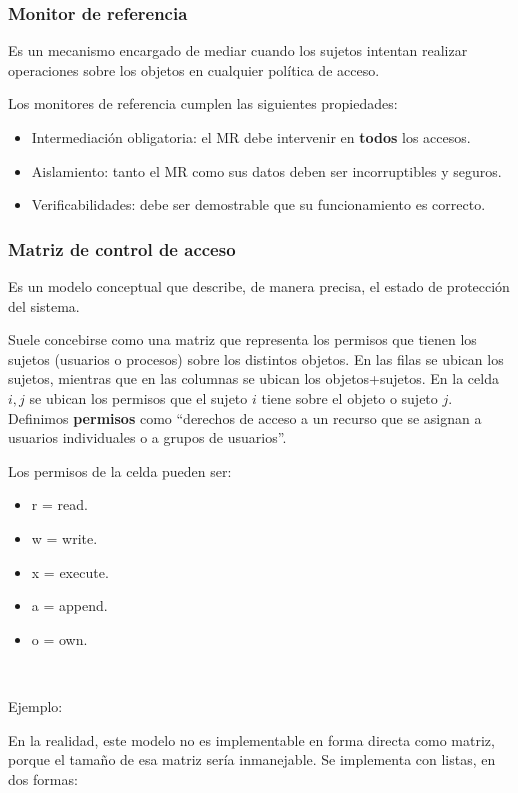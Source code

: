 \documentclass[]{article}
\begin{document}
\subsubsection{Monitor de referencia}
Es un mecanismo encargado de mediar cuando los sujetos intentan realizar operaciones sobre los objetos en cualquier política de acceso.

Los monitores de referencia cumplen las siguientes propiedades:
\begin{itemize}
	\item Intermediación obligatoria: el MR debe intervenir en \textbf{todos} los accesos.
	\item Aislamiento: tanto el MR como sus datos deben ser incorruptibles y seguros.
	\item Verificabilidades: debe ser demostrable que su funcionamiento es correcto.
\end{itemize}


\subsubsection{Matriz de control de acceso}
Es un modelo conceptual que describe, de manera precisa, el estado de protección del sistema.

Suele concebirse como una matriz que representa los permisos que tienen los sujetos (usuarios o procesos) sobre los distintos objetos. En las filas se ubican los sujetos, mientras que en las columnas se ubican los objetos+sujetos. En la celda ${i,j}$ se ubican los permisos que el sujeto $i$ tiene sobre el objeto o sujeto $j$. Definimos \textbf{permisos} como ``derechos de acceso a un recurso que se asignan a usuarios individuales o a grupos de usuarios''.

Los permisos de la celda pueden ser:
\begin{itemize}
	\item r = read.
	\item w = write.
	\item x = execute.
	\item a = append.
	\item o = own.
\end{itemize}


~\newline

Ejemplo:

En la realidad, este modelo no es implementable en forma directa como matriz, porque el tamaño de esa matriz sería inmanejable. Se implementa con listas, en dos formas:
\end{document}
